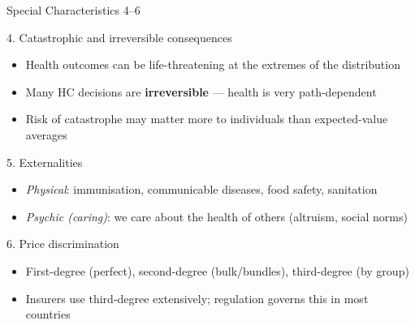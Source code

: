 \documentclass[aspectratio=169, 12pt]{beamer}
\begin{document}
\begin{frame}{Special Characteristics 4--6}
  \begin{block}{4. Catastrophic and irreversible consequences}
    \begin{itemize}
      \item Health outcomes can be life-threatening at the extremes of the distribution
      \item Many HC decisions are \textbf{irreversible} --- health is very path-dependent
      \item Risk of catastrophe may matter more to individuals than expected-value averages
    \end{itemize}
  \end{block}
  \begin{block}{5. Externalities}
    \begin{itemize}
      \item \textit{Physical}: immunisation, communicable diseases, food safety, sanitation
      \item \textit{Psychic (caring)}: we care about the health of others (altruism, social norms)
    \end{itemize}
  \end{block}
  \begin{block}{6. Price discrimination}
    \begin{itemize}
      \item First-degree (perfect), second-degree (bulk/bundles), third-degree (by group)
      \item Insurers use third-degree extensively; regulation governs this in most countries
    \end{itemize}
  \end{block}
\end{frame}
\end{document}
